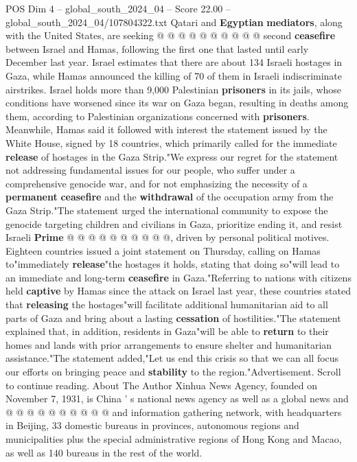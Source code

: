 \begin{textsample}{POS Dim 4 – global\_south\_2024\_04 – Score 22.00 – global\_south\_2024\_04/107804322.txt}
Qatari and \textbf{Egyptian} \textbf{mediators}, along with the United States, are seeking @ @ @ @ @ @ @ @ @ @ second \textbf{ceasefire} between Israel and Hamas, following the first one that lasted until early December last year.
Israel estimates that there are about 134 Israeli hostages in Gaza, while Hamas announced the killing of 70 of them in Israeli indiscriminate airstrikes.
Israel holds more than 9,000 Palestinian \textbf{prisoners} in its jails, whose conditions have worsened since its war on Gaza began, resulting in deaths among them, according to Palestinian organizations concerned with \textbf{prisoners}.
Meanwhile, Hamas said it followed with interest the statement issued by the White House, signed by 18 countries, which primarily called for the immediate \textbf{release} of hostages in the Gaza Strip."We express our regret for the statement not addressing fundamental issues for our people, who suffer under a comprehensive genocide war, and for not emphasizing the necessity of a \textbf{permanent} \textbf{ceasefire} and the \textbf{withdrawal} of the occupation army from the Gaza Strip."The statement urged the international community to expose the genocide targeting children and civilians in Gaza, prioritize ending it, and resist Israeli \textbf{Prime} @ @ @ @ @ @ @ @ @ @, driven by personal political motives.
Eighteen countries issued a joint statement on Thursday, calling on Hamas to"immediately \textbf{release}"the hostages it holds, stating that doing so"will lead to an immediate and long-term \textbf{ceasefire} in Gaza."Referring to nations with citizens held \textbf{captive} by Hamas since the attack on Israel last year, these countries stated that \textbf{releasing} the hostages"will facilitate additional humanitarian aid to all parts of Gaza and bring about a lasting \textbf{cessation} of hostilities."The statement explained that, in addition, residents in Gaza"will be able to \textbf{return} to their homes and lands with prior arrangements to ensure shelter and humanitarian assistance."The statement added,"Let us end this crisis so that we can all focus our efforts on bringing peace and \textbf{stability} to the region."Advertisement.
Scroll to continue reading.
About The Author Xinhua News Agency, founded on November 7, 1931, is China ' s national news agency as well as a global news and @ @ @ @ @ @ @ @ @ @ and information gathering network, with headquarters in Beijing, 33 domestic bureaus in provinces, autonomous regions and municipalities plus the special administrative regions of Hong Kong and Macao, as well as 140 bureaus in the rest of the world.

\end{textsample}
